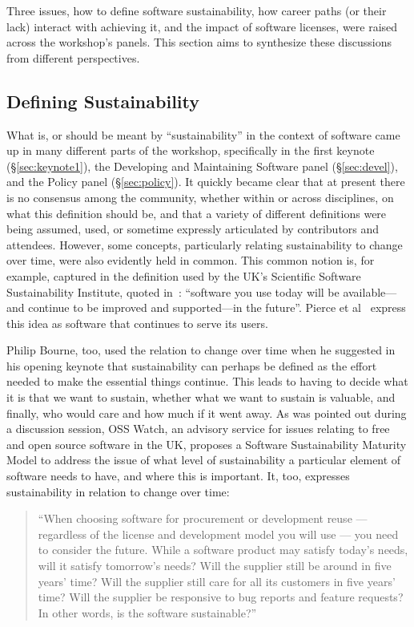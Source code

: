 \documentclass[11pt, oneside]{amsart}
\newcommand{\note}[1]{ {\textcolor{red}    { #1 }}}
\begin{document}
Three issues, how to define software sustainability, how career
paths (or their lack) interact with achieving it, and the impact of
software licenses, were raised across
the workshop's panels.  This section aims to synthesize these
discussions from different perspectives.

\subsection{Defining Sustainability}  \label{sec:defining-sustainability}%

What is, or should be meant by ``sustainability'' in the context of
software came up in many different parts of the workshop, specifically
in the first keynote (\S\ref{sec:keynote1}), the Developing and
Maintaining Software panel (\S\ref{sec:devel}), and the Policy panel
(\S\ref{sec:policy}). It quickly became clear that at present there is
no consensus among the community, whether within or across
disciplines, on what this definition should be, and that a variety of
different definitions were being assumed, used, or sometime expressly
articulated by contributors and attendees. However, some concepts,
particularly relating sustainability to change over time, were also
evidently held in common. This common notion is, for example, captured
in the definition used by the UK's Scientific Software Sustainability
Institute, quoted in~\cite{Venters_WSSSPE}: ``software you use today
will be available---and continue to be improved and supported---in the
future''. Pierce et al~\cite{Pierce_WSSSPE} express this idea as
software that continues to serve its users.

Philip Bourne, too, used the relation to change over time when he
suggested in his opening keynote that sustainability can perhaps be
defined as the effort needed to make the essential things continue.
This leads to having to decide what it is that we want to sustain,
whether what we want to sustain is valuable, and finally, who would
care and how much if it went away. As was pointed out during a
discussion session, OSS Watch, an advisory service for issues relating
to free and open source software in the UK, proposes a Software
Sustainability Maturity Model to address the issue of what level of
sustainability a particular element of software needs to have, and
where this is important. It, too, expresses sustainability in relation
to change over time:
\begin{quote}``When choosing software for procurement or
development reuse --- regardless of the license and development model
you will use --- you need to consider the future. While a software
product may satisfy today's needs, will it satisfy tomorrow's needs?
Will the supplier still be around in five years' time? Will the
supplier still care for all its customers in five years' time? Will
the supplier be responsive to bug reports and feature requests? In
other words, is the software sustainable?''~\cite{OSS-ssmm-web}
\end{quote}
\end{document}
